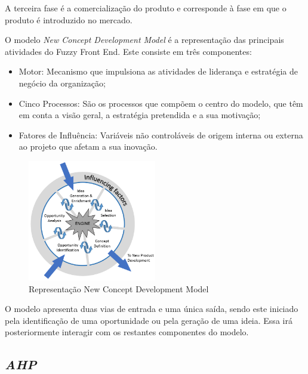 A terceira fase é a comercialização do produto e corresponde à fase em que o produto é introduzido no mercado\cite{fuzzy_frontend}.

O modelo \emph{New Concept Development Model} é a representação das principais atividades do Fuzzy Front End. Este consiste em três componentes:

\begin{itemize}

\item Motor: Mecanismo que impulsiona as atividades de liderança e estratégia de negócio da organização;

\item Cinco Processos: São os processos que compõem o centro do modelo, que têm em conta a visão geral, a estratégia pretendida e a sua motivação;

\item Fatores de Influência: Variáveis não controláveis de origem interna ou externa ao projeto que afetam a sua inovação.

\end{itemize}

\begin{figure}[H]
    \begin{center}
    \includegraphics[width=0.5\textwidth]{figures/The-New-Concept-Development-NCD-model-Koen-et-al-2001.png}
    \caption{Representação New Concept Development Model}
    \end{center}
\end{figure}

O modelo apresenta duas vias de entrada e uma única saída, sendo este iniciado pela identificação de uma oportunidade ou pela geração de uma ideia. Essa irá posteriormente interagir com os restantes componentes do modelo.

\subsection{\emph{\acrfull{AHP}}\label{section_AHP}}

